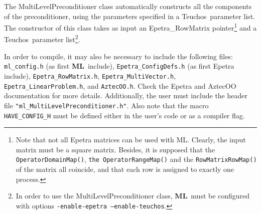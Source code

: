\documentclass{article}[11pt]
\newcommand{\ML}     {{\bf ML}}
\newcommand{\trilinos}  {{\sc Trilinos}}
\newcommand{\teuchos}  {{\sc Teuchos}}
\begin{document}
The MultiLevelPreconditioner class automatically constructs all the
components of the preconditioner, using the parameters specified in a
\teuchos~parameter list.
The constructor of this class takes as input an Epetra\_RowMatrix
pointer\footnote{Note that not all Epetra matrices can be used with ML. Clearly,
the input matrix must be a square matrix. Besides,
it is supposed that the {\tt OperatorDomainMap()}, {\tt the OperatorRangeMap()} and
the {\tt RowMatrixRowMap()} of the matrix all coincide, and that each row is assigned
to exactly one process.} and a \teuchos~parameter list\footnote{In order to use the
  MultiLevelPreconditioner class, \ML\ must be configured with options
  {\tt -enable-epetra --enable-teuchos}.}.


  In order to compile, it may also be necessary to include the following
  files: \verb!ml_config.h! (as first \ML\ include),
  \verb!Epetra_ConfigDefs.h! (as first {\sc Epetra} include),
  \verb!Epetra_RowMatrix.h!, \newline \verb!Epetra_MultiVector.h!,
  \verb!Epetra_LinearProblem.h!, and \verb!AztecOO.h!. Check the {\sc
    Epetra} and {\sc AztecOO} documentation for more details.
  Additionally, the user must include the header file
  \verb!"ml_MultiLevelPreconditioner.h"!.  Also note that the macro
  \verb!HAVE_CONFIG_H!  must be defined either in the user's code or as
  a compiler flag.
\end{document}

